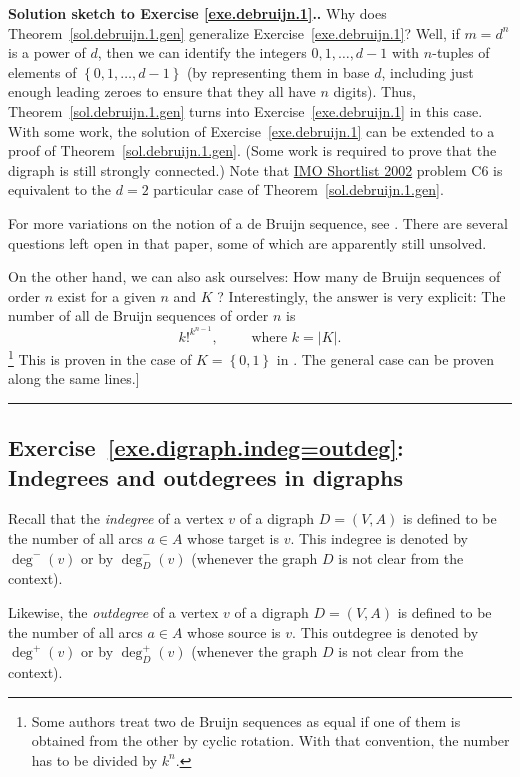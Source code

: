 \documentclass[numbers=enddot,12pt,final,onecolumn,notitlepage]{scrartcl}%
\theoremstyle{definition}
\newenvironment{proof}[1][Proof]{\noindent\textbf{#1.} }{\ \rule{0.5em}{0.5em}}
\newcommand{\set}[1]{\left\{ #1 \right\}}
\newcommand{\abs}[1]{\left| #1 \right|}
\newcommand{\tup}[1]{\left( #1 \right)}
\begin{document}
\begin{proof}[Solution sketch to Exercise \ref{exe.debruijn.1}.]
Why does Theorem~\ref{sol.debruijn.1.gen} generalize
Exercise~\ref{exe.debruijn.1}? Well, if $m = d^n$ is a power of $d$,
then we can identify
the integers $0, 1, \ldots, d-1$ with $n$-tuples of elements of
$\set{0, 1, \ldots, d-1}$ (by representing them in base $d$, including
just enough leading zeroes to ensure that they all have $n$ digits).
Thus, Theorem~\ref{sol.debruijn.1.gen} turns into
Exercise~\ref{exe.debruijn.1} in this
case. With some work, the solution of Exercise~\ref{exe.debruijn.1}
can be extended to a proof of Theorem~\ref{sol.debruijn.1.gen}.
(Some work is required to prove that the digraph is still strongly
connected.) Note that
\href{https://anhngq.files.wordpress.com/2010/07/imo-2002-shortlist.pdf}{IMO Shortlist 2002}
problem C6 is equivalent to the $d = 2$ particular case of
Theorem~\ref{sol.debruijn.1.gen}.

For more variations on the notion of a de Bruijn sequence, see
\cite{ChDiGr92}. There are several
questions left open in that paper, some of which are apparently still
unsolved.

On the other hand, we can also ask ourselves: How many de Bruijn
sequences of order $n$ exist for a given $n$ and $K$ ?
Interestingly, the answer is very explicit: The number of all
de Bruijn sequences of order $n$ is
\[
 k!^{k^{n-1}} ,
 \qquad \text{ where } k = \abs{K} .
\]
\footnote{Some authors treat two de Bruijn sequences as equal
if one of them is obtained from the other by cyclic rotation.
With that convention, the number has to be divided by $k^n$.}
This is proven in the case of $K = \set{0, 1}$ in
\cite[Corollary 10.11]{Stanley13}. The general case can be proven
along the same lines.]
\end{proof}

\subsection{Exercise~\ref{exe.digraph.indeg=outdeg}: Indegrees and
outdegrees in digraphs}

Recall that the \textit{indegree} of a vertex $v$ of a digraph
$D = \tup{V, A}$ is defined to be the number of all arcs $a \in A$
whose target is $v$. This indegree is denoted by
$\deg^-\tup{v}$ or by $\deg^-_D\tup{v}$ (whenever the graph $D$ is not
clear from the context).

Likewise, the \textit{outdegree} of a vertex $v$ of a digraph
$D = \tup{V, A}$ is defined to be the number of all arcs $a \in A$
whose source is $v$. This outdegree is denoted by
$\deg^+\tup{v}$ or by $\deg^+_D\tup{v}$ (whenever the graph $D$ is not
clear from the context).
\end{document}
